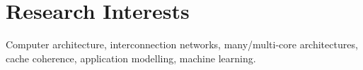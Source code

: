\section{\sc Research Interests}
Computer architecture, interconnection networks, many/multi-core architectures, cache coherence, application modelling, machine learning.